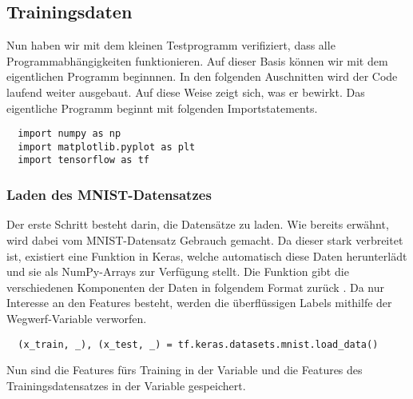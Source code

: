 \subsection{Trainingsdaten}
Nun haben wir mit dem kleinen Testprogramm verifiziert, dass alle
Programmabhängigkeiten funktionieren. Auf dieser Basis können wir mit dem
eigentlichen Programm beginnnen.
\para{}
In den folgenden Auschnitten wird der Code laufend weiter ausgebaut.
Auf diese Weise zeigt sich, was er bewirkt.
Das eigentliche Programm beginnt mit folgenden Importstatements.
\begin{verbatim}
  import numpy as np
  import matplotlib.pyplot as plt
  import tensorflow as tf
\end{verbatim}

\subsubsection{Laden des MNIST-Datensatzes}
Der erste Schritt besteht darin, die Datensätze zu laden. Wie bereits
erwähnt, wird dabei vom MNIST-Datensatz Gebrauch gemacht. Da dieser stark verbreitet ist,
existiert eine Funktion in Keras, welche automatisch diese Daten herunterlädt
und sie als NumPy-Arrays zur Verfügung stellt.
Die Funktion gibt die verschiedenen Komponenten der Daten in folgendem Format zurück .
Da nur Interesse an den Features  besteht, werden die überflüssigen
Labels  mithilfe der Wegwerf-Variable \code{\_} verworfen.
\begin{verbatim}
  (x_train, _), (x_test, _) = tf.keras.datasets.mnist.load_data()
\end{verbatim}
Nun sind die Features fürs Training in der Variable  und die
Features des Trainingsdatensatzes in der Variable  gespeichert.

